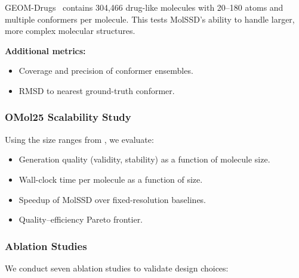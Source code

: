 \documentclass[12pt,a4paper]{article}
\begin{document}
GEOM-Drugs~\cite{axelrod2022geom} contains 304,466 drug-like molecules with 20--180 atoms and multiple conformers per molecule. This tests MolSSD's ability to handle larger, more complex molecular structures.

\textbf{Additional metrics:}
\begin{itemize}
    \item Coverage and precision of conformer ensembles.
    \item RMSD to nearest ground-truth conformer.
\end{itemize}

\subsubsection{OMol25 Scalability Study}

Using the size ranges from , we evaluate:
\begin{itemize}
    \item Generation quality (validity, stability) as a function of molecule size.
    \item Wall-clock time per molecule as a function of size.
    \item Speedup of MolSSD over fixed-resolution baselines.
    \item Quality--efficiency Pareto frontier.
\end{itemize}

\subsubsection{Ablation Studies}

We conduct seven ablation studies to validate design choices:
\end{document}

